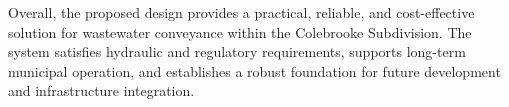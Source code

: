\documentclass[letterpaper,12pt]{report} %
\begin{document}
Overall, the proposed design provides a practical, reliable, and cost-effective solution for wastewater conveyance within the Colebrooke Subdivision. The system satisfies hydraulic and regulatory requirements, supports long-term municipal operation, and establishes a robust foundation for future development and infrastructure integration.






\newpage
\tableofcontents   %
\newpage
\listoffigures
\newpage
\listoftables
\newpage


\end{document}
